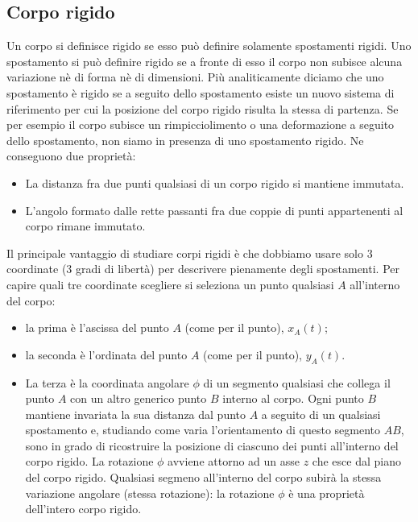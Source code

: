 \subsection{Corpo rigido}
Un corpo si definisce rigido se esso può definire solamente spostamenti rigidi. Uno spostamento si può definire rigido se a fronte di esso il corpo non subisce alcuna variazione nè di forma nè di dimensioni.\newline
Più analiticamente diciamo che uno spostamento è rigido se a seguito dello spostamento esiste un nuovo sistema di riferimento per cui la posizione del corpo rigido risulta la stessa di partenza.\newline
Se per esempio il corpo subisce un rimpicciolimento o una deformazione a seguito dello spostamento, non siamo in presenza di uno spostamento rigido.\newline
Ne conseguono due proprietà:
\begin{itemize}
    \item La distanza fra due punti qualsiasi di un corpo rigido si mantiene immutata.
    \item L'angolo formato dalle rette passanti fra due coppie di punti appartenenti al corpo rimane immutato.
\end{itemize}
Il principale vantaggio di studiare corpi rigidi è che dobbiamo usare solo 3 coordinate (3 gradi di libertà) per descrivere pienamente degli spostamenti.\newline
Per capire quali tre coordinate scegliere si seleziona un punto qualsiasi $A$ all'interno del corpo:
\begin{itemize}
    \item la prima è l'ascissa del punto $A$ (come per il punto), $x_A(t)$;
    \item la seconda è l'ordinata del punto $A$ (come per il punto), $y_A(t)$.
    \item La terza è la coordinata angolare $\phi$ di un segmento qualsiasi che collega il punto $A$ con un altro generico punto $B$ interno al corpo. Ogni punto $B$ mantiene invariata la sua distanza dal punto $A$ a seguito di un qualsiasi spostamento e, studiando come varia l'orientamento di questo segmento $AB$, sono in grado di ricostruire la posizione di ciascuno dei punti all'interno del corpo rigido. La rotazione $\phi$ avviene attorno ad un asse $z$ che esce dal piano del corpo rigido. Qualsiasi segmeno all'interno del corpo subirà la stessa variazione angolare (stessa rotazione): la rotazione $\phi$ è una proprietà dell'intero corpo rigido.
\end{itemize}
